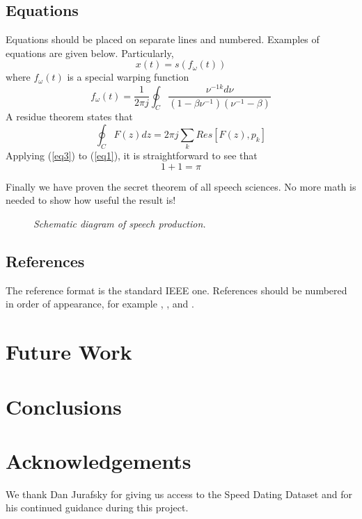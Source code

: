 \documentclass[a4paper]{article}
\begin{document}
\subsection{Equations}

Equations should be placed on separate lines and numbered. Examples 
of equations are given below.
Particularly,
%
\begin{equation}
x(t) = s(f_\omega(t))
\label{eq1}
\end{equation}
where \(f_\omega(t)\) is a special warping function
\begin{equation}
f_\omega(t)=\frac{1}{2\pi j}\oint_C \frac{\nu^{-1k}d\nu}
{(1-\beta\nu^{-1})(\nu^{-1}-\beta)}
\label{eq2}
\end{equation}
A residue theorem states that
\begin{equation}
\oint_C F(z)dz=2 \pi j \sum_k Res[F(z),p_k]
\label{eq3}
\end{equation}
Applying (\ref{eq3}) to (\ref{eq1}), 
it is straightforward to see that
\begin{equation}
1 + 1 = \pi
\label{eq4}
\end{equation}

Finally we have proven the secret theorem of all speech sciences. 
No more math is needed to show how useful the result is! 

\begin{figure}[t]
\centerline{}
\caption{{\it Schematic diagram of speech production.}}  
\label{spprod}
\end{figure}

\subsection{References}

The reference format is the standard IEEE one.
References should be numbered in order of appearance, 
for example \cite{ES1}, \cite{ES2}, and \cite{ES3}. 

\section{Future Work}


\section{Conclusions}


\section{Acknowledgements}
We thank Dan Jurafsky for giving us access to the Speed Dating Dataset and for his continued guidance during this project.
\end{document}
